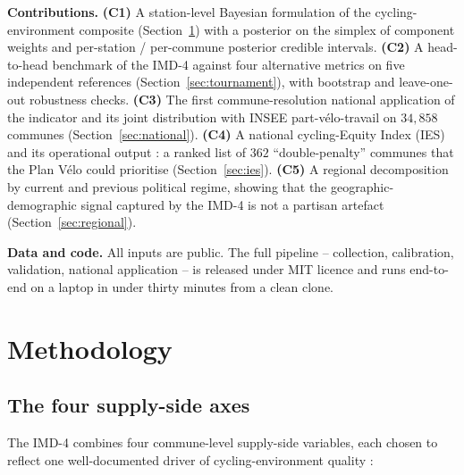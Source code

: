 \documentclass[11pt,a4paper]{article}
\begin{document}
\noindent\textbf{Contributions.}
\textbf{(C1)} A station-level Bayesian formulation of the cycling-
environment composite (Section~\ref{sec:methods}) with a posterior
on the simplex of component weights and per-station / per-commune
posterior credible intervals.
\textbf{(C2)} A head-to-head benchmark of the IMD-4 against four
alternative metrics on five independent references
(Section~\ref{sec:tournament}), with bootstrap and leave-one-out
robustness checks.
\textbf{(C3)} The first commune-resolution national application of
the indicator and its joint distribution with INSEE part-v\'elo-travail
on $34{,}858$ communes (Section~\ref{sec:national}).
\textbf{(C4)} A national cycling-Equity Index (IES) and its operational
output : a ranked list of $362$ ``double-penalty'' communes that the
Plan V\'elo could prioritise (Section~\ref{sec:ies}).
\textbf{(C5)} A regional decomposition by current and previous
political regime, showing that the geographic-demographic signal
captured by the IMD-4 is not a partisan artefact
(Section~\ref{sec:regional}).

\noindent\textbf{Data and code.}  All inputs are public.  The full
pipeline -- collection, calibration, validation, national application
-- is released under MIT licence and runs end-to-end on a laptop in
under thirty minutes from a clean clone.

\section{Methodology}
\label{sec:methods}

\subsection{The four supply-side axes}

The IMD-4 combines four commune-level supply-side variables, each
chosen to reflect one well-documented driver of cycling-environment
quality :
\end{document}
